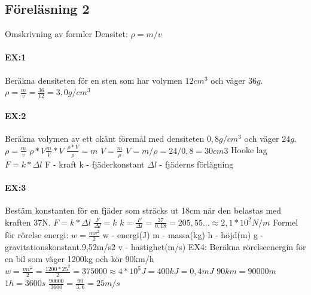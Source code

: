 \documentclass[a4paper,11pt]{article}
\begin{document}
\begin{flushleft}
\section{Föreläsning 2}
Omskrivning av formler\newline
Densitet: $ \rho = m/v $\newline
\paragraph{EX:1}
Beräkna densiteten för en sten som har volymen $ 12cm^3 $ och väger $ 36 g $.\newline
$ \rho = \frac{m}{v} = \frac{36}{12} = 3,0g/cm^3 $\newline \newline
\paragraph{EX:2}
Beräkna volymen av ett okänt föremål med densiteten $ 0,8g/cm^3 $ och väger $ 24g $.\newline
$ \rho = \frac{m}{v} $\newline
$ \rho * V \frac{m}{V} * V $\newline
$ \frac{\rho * V}{\rho} = m $\newline
$ V = \frac{m}{\rho} $\newline
$ V=m/\rho = 24/0,8 = 30cm3 $ \newline
Hooke lag\newline
$ F=k*\Delta l $\newline
F - kraft\newline
k - fjäderkonstant\newline
$ \Delta l $ - fjäderns förlägning\newline
\paragraph{EX:3}
Bestäm konstanten för en fjäder  som sträcks ut 18cm när den belastas med kraften 37N.\newline
$ F=k*\Delta l $\newline
$ \frac{F}{\Delta l} = k $\newline
$ k = \frac{F}{\Delta l} = \frac{37}{0,18} = 205,55... \approx 2,1*10^2 N/m $\newline
Formel för rörelse energi: $ w = \frac{mv^2}{2} $\newline
w - energi(J)\newline
m - massa(kg)\newline
h - höjd(m)\newline
g - gravitationskonstant.9,52m/s2\newline
v - hastighet(m/s)\newline
EX4:\newline
Beräkna rörelseenergin för en bil som väger 1200kg och kör 90km/h\newline
$ w = \frac{mv^2}{2} = \frac{1200*25^2}{2} = 375000 \approx 4*10^5 J = 400 kJ = 0,4 mJ $\newline
$ 90km = 90000m $\newline
$ 1h = 3600s $\newline
$ \frac{90000}{3600} = \frac{90}{3,6} = 25m/s $\newline
\newpage

\end{flushleft}
\end{document}

